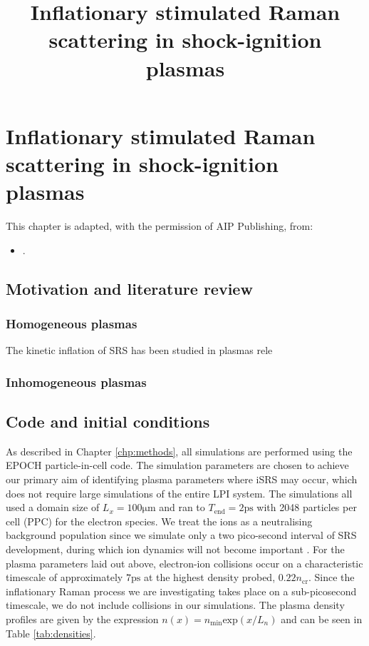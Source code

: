 
\chapter{Inflationary stimulated Raman scattering in shock-ignition plasmas}
\label{chp:iSRS}

\nobibliography*

\title{Inflationary stimulated Raman scattering in shock-ignition plasmas}

This chapter is adapted, with the permission of AIP Publishing, from:
\begin{itemize}
  \item {}.
\end{itemize}

\section{Motivation and literature review}


\subsection{Homogeneous plasmas}
The kinetic inflation of SRS has been studied in plasmas rele

\subsection{Inhomogeneous plasmas}


\section{Code and initial conditions}\label{sec:code&IC}
As described in Chapter \ref{chp:methods}, all simulations are performed using the EPOCH \cite{Arber2015} particle-in-cell code. The simulation parameters are chosen to achieve our primary aim of identifying plasma parameters where iSRS may occur, which does not require large simulations of the entire LPI system. The simulations all used a domain size of $L_x = 100\si{\micro\metre} $ and ran to $T_\mathrm{end} = 2\si{\pico\second}$
with 2048
particles per cell (PPC) for the electron species.
We treat the ions as a neutralising background population since we simulate only a two pico-second interval of SRS
development, during which ion dynamics will not become important \cite{Rousseaux2006}.
For the plasma parameters laid out above, electron-ion collisions occur on a characteristic timescale of approximately
$7 \si{\pico\second}$ at the highest density probed, $0.22n_\mathrm{cr}$. Since the inflationary Raman process we
are investigating takes place
on a sub-picosecond timescale, we do not include collisions in our simulations.
The plasma density profiles are given by the expression $n(x) = n_\mathrm{min}\mathrm{exp}(x/L_n)$ and can be seen in Table
\ref{tab:densities}.

